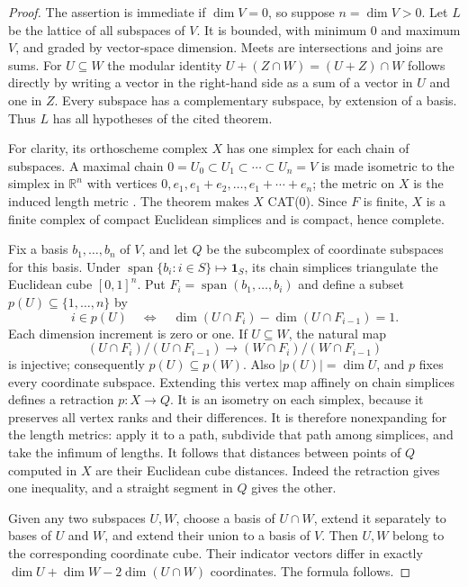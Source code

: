 \begin{proof}
The assertion is immediate if $\dim V=0$, so suppose $n=\dim V>0$.
Let $L$ be the lattice of all subspaces of $V$.
It is bounded, with minimum $0$ and maximum $V$, and graded by
vector-space dimension. Meets are intersections and joins are sums.
For $U\subseteq W$ the modular identity
$U+(Z\cap W)=(U+Z)\cap W$ follows directly by writing a vector
in the right-hand side as a sum of a vector in $U$ and one in $Z$.
Every subspace has a complementary subspace, by extension of a basis.
Thus $L$ has all hypotheses of the cited theorem.

For clarity, its orthoscheme complex $X$ has one simplex for each
chain of subspaces. A maximal chain
$0=U_0\subset U_1\subset\cdots\subset U_n=V$
is made isometric to the simplex in $\mathbb R^n$ with vertices
$0,e_1,e_1+e_2,\ldots,e_1+\cdots+e_n$; the metric on $X$ is the
induced length metric \cite[Definition~2.17, p.~6]{HKS2016}.
The theorem makes $X$ CAT(0). Since $F$ is finite, $X$ is a finite
complex of compact Euclidean simplices and is compact, hence complete.

Fix a basis $b_1,\ldots,b_n$ of $V$, and let $Q$ be the subcomplex
of coordinate subspaces for this basis. Under
$\operatorname{span}\{b_i:i\in S\}\mapsto\mathbf1_S$, its chain
simplices triangulate the Euclidean cube $[0,1]^n$.
Put $F_i=\operatorname{span}(b_1,\ldots,b_i)$ and define a subset
$p(U)\subseteq\{1,\ldots,n\}$ by
\[
 i\in p(U)\quad\Longleftrightarrow\quad
 \dim(U\cap F_i)-\dim(U\cap F_{i-1})=1.
\]
Each dimension increment is zero or one. If $U\subseteq W$, the
natural map
\[
 (U\cap F_i)/(U\cap F_{i-1})
       \longrightarrow (W\cap F_i)/(W\cap F_{i-1})
\]
is injective; consequently $p(U)\subseteq p(W)$.
Also $|p(U)|=\dim U$, and $p$ fixes every coordinate subspace.
Extending this vertex map affinely on chain simplices defines a
retraction $p:X\to Q$. It is an isometry on each simplex, because
it preserves all vertex ranks and their differences. It is therefore
nonexpanding for the length metrics: apply it to a path, subdivide
that path among simplices, and take the infimum of lengths.
It follows that distances between points of $Q$ computed in $X$
are their Euclidean cube distances. Indeed the retraction gives
one inequality, and a straight segment in $Q$ gives the other.

Given any two subspaces $U,W$, choose a basis of $U\cap W$,
extend it separately to bases of $U$ and $W$, and extend their
union to a basis of $V$. Then $U,W$ belong to the corresponding
coordinate cube. Their indicator vectors differ in exactly
$\dim U+\dim W-2\dim(U\cap W)$ coordinates. The formula follows.
\end{proof}

